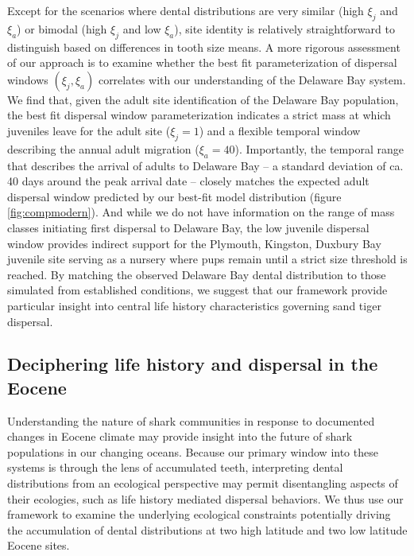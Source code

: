 \documentclass[]{rsos}%
\begin{document}
Except for the scenarios where dental distributions are very similar (high $\xi_j$ and $\xi_a$) or bimodal (high $\xi_j$ and low $\xi_a$), site identity is relatively straightforward to distinguish based on differences in tooth size means.
A more rigorous assessment of our approach is to examine whether the best fit parameterization of dispersal windows $(\xi_j,\xi_a)$ correlates with our understanding of the Delaware Bay system.
We find that, given the adult site identification of the Delaware Bay population, the best fit dispersal window parameterization indicates a strict mass at which juveniles leave for the adult site ($\xi_j = 1$) and a flexible temporal window describing the annual adult migration ($\xi_a = 40$).
Importantly, the temporal range that describes the arrival of adults to Delaware Bay -- a standard deviation of ca. 40 days around the peak arrival date \cite{haulsee2018spatial}  -- closely matches the expected adult dispersal window predicted by our best-fit model distribution (figure \ref{fig:compmodern}).
And while we do not have information on the range of mass classes initiating first dispersal to Delaware Bay, the low juvenile dispersal window provides indirect support for the Plymouth, Kingston, Duxbury Bay juvenile site serving as a nursery where pups remain until a strict size threshold is reached. 
By matching the observed Delaware Bay dental distribution to those simulated from established conditions, we suggest that our framework  provide particular insight into central life history characteristics governing sand tiger dispersal.



\subsection{Deciphering life history and dispersal in the Eocene}

Understanding the nature of shark communities in response to documented changes in Eocene climate may provide insight into the future of shark populations in our changing oceans.
Because our primary window into these systems is through the lens of accumulated teeth, interpreting dental distributions from an ecological perspective may permit disentangling aspects of their ecologies, such as life history mediated dispersal behaviors.
We thus use our framework to examine the underlying ecological constraints potentially driving the accumulation of dental distributions at two high latitude and two low latitude Eocene sites.
\end{document}
